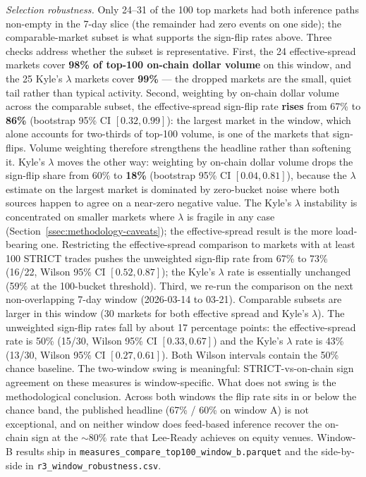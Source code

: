 \documentclass[11pt,a4paper,twocolumn]{article}
\begin{document}
\textit{Selection robustness.}
Only 24--31 of the 100 top markets had both inference paths non-empty
in the 7-day slice (the remainder had zero events on one side); the
comparable-market subset is what supports the sign-flip rates above.
Three checks address whether the subset is representative.
First, the 24 effective-spread markets cover \textbf{98\% of top-100
on-chain dollar volume} on this window, and the 25 Kyle's $\lambda$
markets cover \textbf{99\%} — the dropped markets are the small,
quiet tail rather than typical activity. Second, weighting by
on-chain dollar volume across the comparable subset, the
effective-spread sign-flip rate \textbf{rises} from 67\% to
\textbf{86\%} (bootstrap 95\% CI $[0.32, 0.99]$): the largest market
in the window, which alone accounts for two-thirds of top-100 volume,
is one of the markets that sign-flips. Volume weighting therefore
strengthens the headline rather than softening it. Kyle's $\lambda$
moves the other way: weighting by on-chain dollar volume drops the
sign-flip share from 60\% to \textbf{18\%} (bootstrap 95\% CI
$[0.04, 0.81]$), because the $\lambda$ estimate on the largest market
is dominated by zero-bucket noise where both sources happen to agree
on a near-zero negative value. The Kyle's $\lambda$ instability is
concentrated on smaller markets where $\lambda$ is fragile in any
case (Section~\ref{ssec:methodology-caveats}); the effective-spread
result is the more load-bearing one. Restricting the
effective-spread comparison to markets with at least 100 STRICT
trades pushes the unweighted sign-flip rate from 67\% to 73\% (16/22,
Wilson 95\% CI $[0.52, 0.87]$); the Kyle's $\lambda$ rate is
essentially unchanged (59\% at the 100-bucket threshold). Third, we
re-run the comparison on the next non-overlapping 7-day window
(2026-03-14 to 03-21). Comparable subsets are larger in this window
(30 markets for both effective spread and Kyle's $\lambda$). The
unweighted sign-flip rates fall by about 17 percentage points: the
effective-spread rate is 50\% (15/30, Wilson 95\% CI $[0.33, 0.67]$)
and the Kyle's $\lambda$ rate is 43\% (13/30, Wilson 95\% CI
$[0.27, 0.61]$). Both Wilson intervals contain the 50\% chance
baseline. The two-window swing is meaningful: STRICT-vs-on-chain
sign agreement on these measures is window-specific. What does not
swing is the methodological conclusion. Across both windows the
flip rate sits in or below the chance band, the published headline
(67\% / 60\% on window A) is not exceptional, and on neither window
does feed-based inference recover the on-chain sign at the
$\sim 80\%$ rate that Lee-Ready achieves on equity venues. Window-B
results ship in
\texttt{measures\_\allowbreak compare\_\allowbreak top100\_\allowbreak window\_b.parquet}
and the side-by-side
in \texttt{r3\_\allowbreak window\_\allowbreak robustness.csv}.
\end{document}
